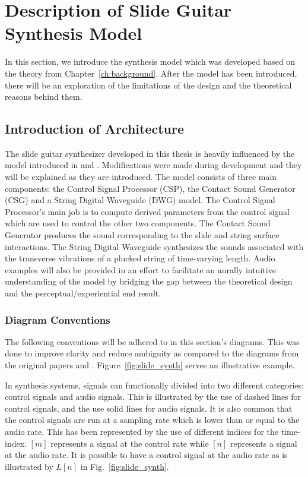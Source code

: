 \documentclass[../main.tex]{subfiles}
\begin{document}
\chapter{Description of Slide Guitar Synthesis Model}
\label{ch:three}
In this section, we introduce the synthesis model which was developed based on the theory from Chapter~\ref{ch:background}. After the model has been introduced, there will be an exploration of the limitations of the design and the theoretical reasons behind them.

\section{Introduction of Architecture}
The slide guitar synthesizer developed in this thesis is heavily influenced by the model introduced in  and . Modifications were made during development and they will be explained as they are introduced. The model consists of three main components: the Control Signal Processor (CSP), the Contact Sound Generator (CSG) and a String Digital Waveguide (DWG) model. The Control Signal Processor's main job is to compute derived parameters from the control signal which are used to control the other two components. The Contact Sound Generator produces the sound corresponding to the slide and string surface interactions. The String Digital Waveguide synthesizes the sounds associated with the transverse vibrations of a plucked string of time-varying length. Audio examples will also be provided in an effort to facilitate an aurally intuitive understanding of the model by bridging the gap between the theoretical design and the perceptual/experiential end result.

\subsection{Diagram Conventions}
The following conventions will be adhered to in this section's diagrams. This was done to improve clarity and reduce ambiguity as compared to the diagrams from the original papers  and . Figure~\ref{fig:slide_synth} serves an illustrative example.

In synthesis systems, signals can functionally divided into two different categories: control signals and audio signals. This is illustrated by the use of dashed lines for control signals, and the use solid lines for audio signals. It is also common that the control signals are run at a sampling rate which is lower than or equal to the audio rate. This has been represented by the use of different indices for the time-index. $[m]$ represents a signal at the control rate while $[n]$ represents a signal at the audio rate. It is possible to have a control signal at the audio rate as is illustrated by $L[n]$ in Fig.~\ref{fig:slide_synth}.
\end{document}
